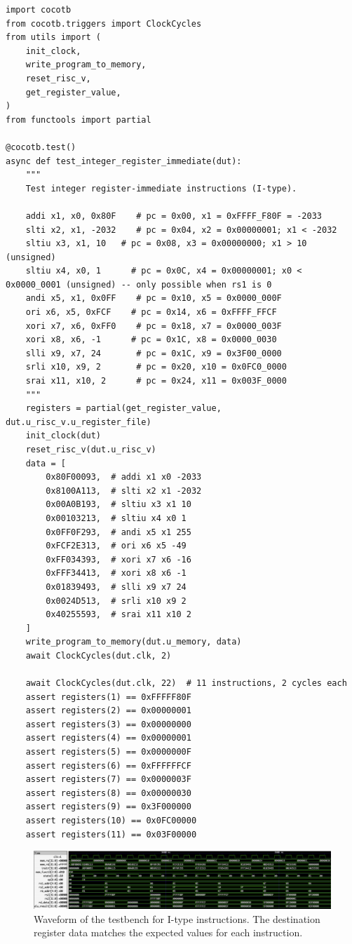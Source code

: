 \begin{verbatim}
import cocotb
from cocotb.triggers import ClockCycles
from utils import (
    init_clock,
    write_program_to_memory,
    reset_risc_v,
    get_register_value,
)
from functools import partial

@cocotb.test()
async def test_integer_register_immediate(dut):
    """
    Test integer register-immediate instructions (I-type).

    addi x1, x0, 0x80F    # pc = 0x00, x1 = 0xFFFF_F80F = -2033
    slti x2, x1, -2032    # pc = 0x04, x2 = 0x00000001; x1 < -2032
    sltiu x3, x1, 10   # pc = 0x08, x3 = 0x00000000; x1 > 10 (unsigned)
    sltiu x4, x0, 1      # pc = 0x0C, x4 = 0x00000001; x0 < 0x0000_0001 (unsigned) -- only possible when rs1 is 0
    andi x5, x1, 0x0FF    # pc = 0x10, x5 = 0x0000_000F
    ori x6, x5, 0xFCF    # pc = 0x14, x6 = 0xFFFF_FFCF
    xori x7, x6, 0xFF0    # pc = 0x18, x7 = 0x0000_003F
    xori x8, x6, -1      # pc = 0x1C, x8 = 0x0000_0030
    slli x9, x7, 24       # pc = 0x1C, x9 = 0x3F00_0000
    srli x10, x9, 2       # pc = 0x20, x10 = 0x0FC0_0000
    srai x11, x10, 2      # pc = 0x24, x11 = 0x003F_0000
    """
    registers = partial(get_register_value, dut.u_risc_v.u_register_file)
    init_clock(dut)
    reset_risc_v(dut.u_risc_v)
    data = [
        0x80F00093,  # addi x1 x0 -2033
        0x8100A113,  # slti x2 x1 -2032
        0x00A0B193,  # sltiu x3 x1 10
        0x00103213,  # sltiu x4 x0 1
        0x0FF0F293,  # andi x5 x1 255
        0xFCF2E313,  # ori x6 x5 -49
        0xFF034393,  # xori x7 x6 -16
        0xFFF34413,  # xori x8 x6 -1
        0x01839493,  # slli x9 x7 24
        0x0024D513,  # srli x10 x9 2
        0x40255593,  # srai x11 x10 2
    ]
    write_program_to_memory(dut.u_memory, data)
    await ClockCycles(dut.clk, 2)

    await ClockCycles(dut.clk, 22)  # 11 instructions, 2 cycles each
    assert registers(1) == 0xFFFFF80F
    assert registers(2) == 0x00000001
    assert registers(3) == 0x00000000
    assert registers(4) == 0x00000001
    assert registers(5) == 0x0000000F
    assert registers(6) == 0xFFFFFFCF
    assert registers(7) == 0x0000003F
    assert registers(8) == 0x00000030
    assert registers(9) == 0x3F000000
    assert registers(10) == 0x0FC00000
    assert registers(11) == 0x03F00000
\end{verbatim}

\begin{figure}[H]
    \centering
    \includegraphics[width=\textwidth]{media/int_i_type_waveform}
    \caption{Waveform of the testbench for I-type instructions. The destination register data matches the expected values for each instruction.}
    \label{fig:i-type-waveform}
\end{figure}

